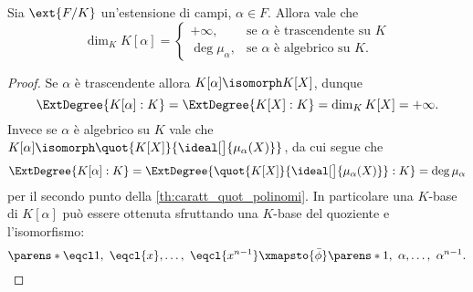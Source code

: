\begin{proposition}
    Sia $\ext{F/K}$ un'estensione di campi, $\alpha \in F$. Allora vale che \[
        \dim_K K[\alpha] = \begin{cases}
            +\infty, &\text{se $\alpha$ è trascendente su $K$}\\
            \deg \mu_\alpha, &\text{se $\alpha$ è algebrico su $K$.}
        \end{cases}    
    \]
\end{proposition}
\begin{proof}
    Se $\alpha$ è trascendente allora $K[\alpha] \isomorph K[X]$, dunque \[
        \ExtDegree{K[\alpha]: K} = \ExtDegree{K[X]: K} = \dim_K K[X] = +\infty.
    \] Invece se $\alpha$ è algebrico su $K$ vale che $K[\alpha] \isomorph \quot{K[X]}{\ideal[\big]{\mu_\alpha(X)}}$, da cui segue che \[
        \ExtDegree{K[\alpha]: K} = \ExtDegree{\quot{K[X]}{\ideal[\big]{\mu_\alpha(X)}} : K} = \deg \mu_\alpha
    \] per il secondo punto della \autoref{th:caratt_quot_polinomi}. In particolare una $K$-base di $K[\alpha]$ può essere ottenuta sfruttando una $K$-base del quoziente e l'isomorfismo: \[
        \parens*{\eqcl 1,\ \eqcl{x}, \dots,\ \eqcl{x^{n-1}}} \xmapsto{\bar\phi} \parens*{1,\ \alpha, \dots,\ \alpha^{n-1}}.    
    \]
\end{proof}